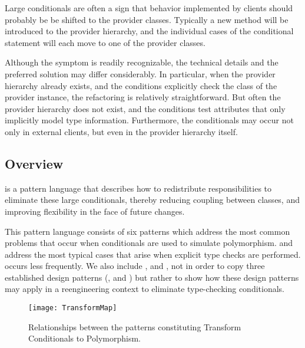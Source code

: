 \documentclass[a4paper,10pt,twoside]{book}
\begin{document}
Large conditionals are often a sign that behavior implemented by clients should probably be be shifted to the provider classes. Typically a new method will be introduced to the provider hierarchy, and the individual cases of the conditional statement will each move to one of the provider classes.

Although the symptom is readily recognizable, the technical details and the preferred solution may differ considerably. In particular, when the provider hierarchy already exists, and the conditions explicitly check the class of the provider instance, the refactoring is relatively straightforward. But often the provider hierarchy does not exist, and the conditions test attributes that only implicitly model type information. Furthermore, the conditionals may occur not only in external clients, but even in the provider hierarchy itself. 

\subsection*{Overview}

 is a pattern language that describes how to redistribute responsibilities to eliminate these large conditionals, thereby reducing coupling between classes, and improving flexibility in the face of future changes. 

This pattern language consists of six patterns which address the most common problems that occur when conditionals are used to simulate polymorphism.  and  address the most typical cases that arise when explicit type checks are performed.  occurs less frequently. We also include ,  and , not in order to copy three established design patterns (, and ) but rather to show how these design patterns may apply in a reengineering context to eliminate type-checking conditionals.

\begin{figure}
\begin{center}
\texttt{[image: TransformMap]}
\caption{Relationships between the patterns constituting Transform Conditionals to Polymorphism.}
\end{center}
\end{figure}
\end{document}
